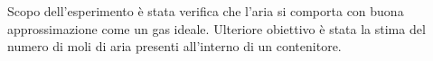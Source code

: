 Scopo dell'esperimento è stata verifica che l'aria si comporta con buona approssimazione come un gas ideale. Ulteriore
obiettivo è stata la stima del numero di moli di aria presenti all'interno di un contenitore.
